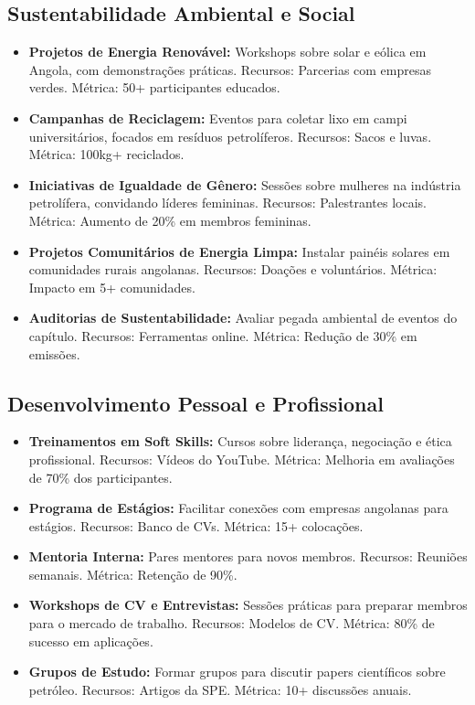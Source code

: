 \documentclass[12pt]{article}
\begin{document}
\subsection{Sustentabilidade Ambiental e Social}
\begin{itemize}
    \item \textbf{Projetos de Energia Renovável:} Workshops sobre solar e eólica em Angola, com demonstrações práticas. Recursos: Parcerias com empresas verdes. Métrica: 50+ participantes educados.
    \item \textbf{Campanhas de Reciclagem:} Eventos para coletar lixo em campi universitários, focados em resíduos petrolíferos. Recursos: Sacos e luvas. Métrica: 100kg+ reciclados.
    \item \textbf{Iniciativas de Igualdade de Gênero:} Sessões sobre mulheres na indústria petrolífera, convidando líderes femininas. Recursos: Palestrantes locais. Métrica: Aumento de 20\% em membros femininas.
    \item \textbf{Projetos Comunitários de Energia Limpa:} Instalar painéis solares em comunidades rurais angolanas. Recursos: Doações e voluntários. Métrica: Impacto em 5+ comunidades.
    \item \textbf{Auditorias de Sustentabilidade:} Avaliar pegada ambiental de eventos do capítulo. Recursos: Ferramentas online. Métrica: Redução de 30\% em emissões.
\end{itemize}

\subsection{Desenvolvimento Pessoal e Profissional}
\begin{itemize}
    \item \textbf{Treinamentos em Soft Skills:} Cursos sobre liderança, negociação e ética profissional. Recursos: Vídeos do YouTube. Métrica: Melhoria em avaliações de 70\% dos participantes.
    \item \textbf{Programa de Estágios:} Facilitar conexões com empresas angolanas para estágios. Recursos: Banco de CVs. Métrica: 15+ colocações.
    \item \textbf{Mentoria Interna:} Pares mentores para novos membros. Recursos: Reuniões semanais. Métrica: Retenção de 90\%.
    \item \textbf{Workshops de CV e Entrevistas:} Sessões práticas para preparar membros para o mercado de trabalho. Recursos: Modelos de CV. Métrica: 80\% de sucesso em aplicações.
    \item \textbf{Grupos de Estudo:} Formar grupos para discutir papers científicos sobre petróleo. Recursos: Artigos da SPE. Métrica: 10+ discussões anuais.
\end{itemize}
\end{document}
